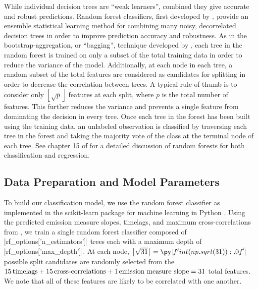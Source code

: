 While individual decision trees are ``weak learners'', combined they give accurate and robust predictions. Random forest classifiers, first developed by \citet{breiman_random_2001}, provide an ensemble statistical learning method for combining many noisy, decorrelated decision trees in order to improve prediction accuracy and robustness. As in the bootstrap-aggregation, or ``bagging'', technique developed by \citet{breiman_bagging_1996}, each tree in the random forest is trained on only a subset of the total training data in order to reduce the variance of the model. Additionally, at each node in each tree, a random subset of the total features are considered as candidates for splitting in order to decrease the correlation between trees. A typical rule-of-thumb is to consider only $\left\lfloor\sqrt{p}\right\rfloor$ features at each split, where $p$ is the total number of features. This further reduces the variance and prevents a single feature from dominating the decision in every tree. Once each tree in the forest has been built using the training data, an unlabeled observation is classified by traversing each tree in the forest and taking the majority vote of the class at the terminal node of each tree. See chapter 15 of \citet{hastie_elements_2009} for a detailed discussion of random forests for both classification and regression.

\subsection{Data Preparation and Model Parameters}\label{sec:data-prep}

To build our classification model, we use the random forest classifier as implemented in the scikit-learn package for machine learning in Python \citep{pedregosa_scikit-learn_2011}. Using the predicted emission measure slopes, timelags, and maximum cross-correlations from , we train a single random forest classifier composed of \py[manager_ml]|rf_options['n_estimators']| trees each with a maximum depth of \py[manager_ml]|rf_options['max_depth']|. At each node, $\left\lfloor\sqrt{31}\right\rfloor=\py|f'{int(np.sqrt(31)):.0f}'|$ possible split candidates are randomly selected from the $15\,\textup{timelags} + 15\,\textup{cross-correlations} + 1\,\textup{emission measure slope}=31$ total features. We note that all of these features are likely to be correlated with one another.

